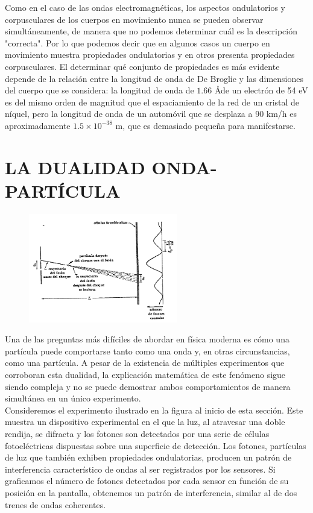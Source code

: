 \documentclass[a4paper]{article}
\begin{document}
    \indent Como en el caso de las ondas electromagnéticas, los aspectos ondulatorios y corpusculares de los cuerpos en movimiento nunca se pueden observar simultáneamente, de manera que no podemos determinar cuál es la descripción "correcta". Por lo que podemos decir que en algunos casos un cuerpo en movimiento muestra propiedades ondulatorias y en otros presenta propiedades corpusculares. El determinar qué conjunto de propiedades es más evidente depende de la relación entre la longitud de onda de De Broglie y las dimensiones del cuerpo que se considera: la longitud de onda de $1.66$ \AA de un electrón de 54 eV es del mismo orden de magnitud que el espaciamiento de la red de un cristal de níquel, pero la longitud de onda de un automóvil que se desplaza a 90 km/h es aproximadamente $1.5 \times 10^{-38}$ m, que es demasiado pequeña para manifestarse.

\section{LA DUALIDAD ONDA-PARTÍCULA}

    \begin{figure}[h!]
        \centering
        \includegraphics[width = 6.5cm]{../expDualidadOP.png}
    \end{figure}

    \indent Una de las preguntas más difíciles de abordar en física moderna es cómo una partícula puede comportarse tanto como una onda y, en otras circunstancias, como una partícula. A pesar de la existencia de múltiples experimentos que corroboran esta dualidad, la explicación matemática de este fenómeno sigue siendo compleja y no se puede demostrar ambos comportamientos de manera simultánea en un único experimento.\\ 

    \indent Consideremos el experimento ilustrado en la figura al inicio de esta sección. Este muestra un dispositivo experimental en el que la luz, al atravesar una doble rendija, se difracta y los fotones son detectados por una serie de células fotoeléctricas dispuestas sobre una superficie de detección. Los fotones, partículas de luz que también exhiben propiedades ondulatorias, producen un patrón de interferencia característico de ondas al ser registrados por los sensores. Si graficamos el número de fotones detectados por cada sensor en función de su posición en la pantalla, obtenemos un patrón de interferencia, similar al de dos trenes de ondas coherentes.\\
\end{document}
